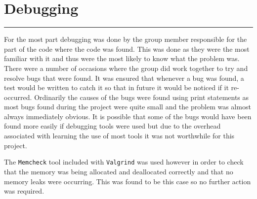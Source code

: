 \section{Debugging}
\vspace{-2em}\rule{\textwidth}{1pt}\vspace{1em}

For the most part debugging was done by the group member responsible for the part of the code where the code was found.
This was done as they were the most familiar with it and thus were the most likely to know what the problem was.
There were a number of occasions where the group did work together to try and resolve bugs that were found.
It was ensured that whenever a bug was found, a test would be written to catch it so that in future it would be noticed if it re-occurred.
Ordinarily the causes of the bugs were found using print statements as most bugs found during the project were quite small and the problem was almost always immediately obvious.
It is possible that some of the bugs would have been found more easily if debugging tools were used but due to the overhead associated with learning the use of most tools it was not worthwhile for this project.

The \texttt{Memcheck} tool included with \texttt{Valgrind} was used however in order to check that the memory was being allocated and deallocated correctly and that no memory leaks were occurring.
This was found to be this case so no further action was required.
